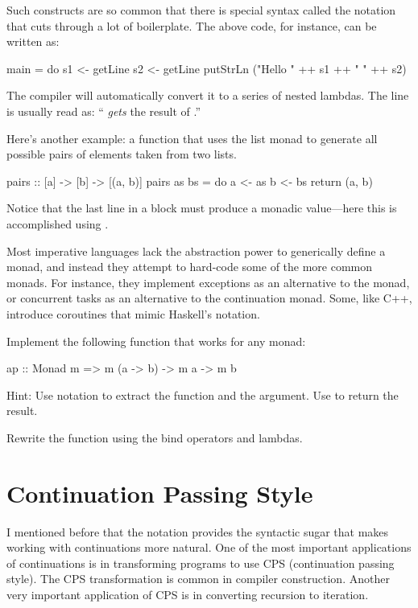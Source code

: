 \documentclass[DaoFP]{subfiles}
\begin{document}
Such constructs are so common that there is special syntax called the  notation that cuts through a lot of boilerplate. The above code, for instance, can be written as:
\begin{haskell}
main = do
  s1 <- getLine
  s2 <- getLine
  putStrLn ("Hello " ++ s1 ++ " " ++ s2)
\end{haskell}
The compiler will automatically convert it to a series of nested lambdas. The line  is usually read as: `` \emph{gets} the result of .''

Here's another example: a function that uses the list monad to generate all possible pairs of elements taken from two lists.
\begin{haskell}
pairs :: [a] -> [b] -> [(a, b)]
pairs as bs = do
  a <- as
  b <- bs
  return (a, b)
\end{haskell}
Notice that the last line in a  block must produce a monadic value---here this is accomplished using .

Most imperative languages lack the abstraction power to generically define a monad, and instead they attempt to hard-code some of the more common monads. For instance, they implement exceptions as an alternative to the  monad, or concurrent tasks as an alternative to the continuation monad. Some, like C++, introduce coroutines that mimic Haskell's  notation. 

\begin{exercise}
Implement the following function that works for any monad:
\begin{haskell}
ap :: Monad m => m (a -> b) -> m a -> m b
\end{haskell}
Hint: Use  notation to extract the function and the argument. Use  to return the result.
\end{exercise}

\begin{exercise}
Rewrite the  function using the bind operators and lambdas.
\end{exercise}

\section{Continuation Passing Style}

I mentioned before that the  notation provides the syntactic sugar that makes working with continuations more natural. One of the most important applications of continuations is in transforming programs to use CPS (continuation passing style). The CPS transformation is common in compiler construction. Another very important application of CPS is in converting recursion to iteration. 
\end{document}
